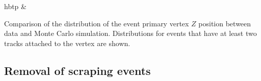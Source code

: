 \begin{2figures}{hbtp}
   &
   \\
 \label{fig:vertex_selection_1}
\caption{Comparison of the distribution of the event primary vertex $Z$
  position between data and Monte Carlo simulation. Distributions for
  events that have at least two tracks attached to the vertex are shown.}
\end{2figures}

\subsection{Removal of scraping events}

